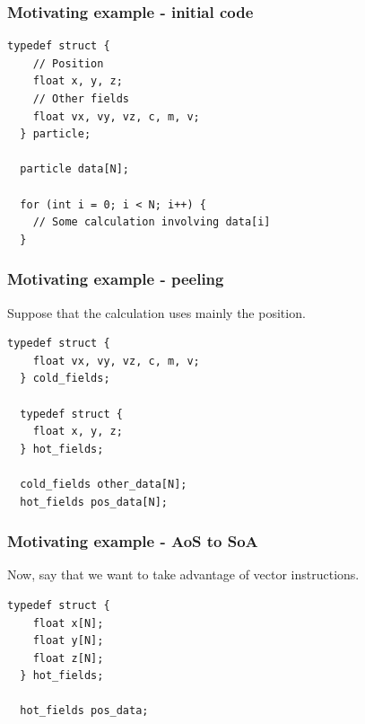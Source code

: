 \begin{frame}[fragile]
\frametitle{Motivating example - initial code}

\begin{lstlisting}[style=Cstyle]
  typedef struct {
    // Position
    float x, y, z;
    // Other fields
    float vx, vy, vz, c, m, v;
  } particle;

  particle data[N];

  for (int i = 0; i < N; i++) {
    // Some calculation involving data[i]
  }
\end{lstlisting}

\end{frame}


\begin{frame}[fragile]
\frametitle{Motivating example - peeling}

Suppose that the calculation uses mainly the position.

\begin{lstlisting}[style=Cstyle]
  typedef struct {
    float vx, vy, vz, c, m, v;
  } cold_fields;

  typedef struct {
    float x, y, z;
  } hot_fields;

  cold_fields other_data[N];
  hot_fields pos_data[N];
\end{lstlisting}

\end{frame}


\begin{frame}[fragile]
\frametitle{Motivating example - AoS to SoA}

Now, say that we want to take advantage of vector instructions.

\bigskip

\begin{lstlisting}[style=Cstyle]
  typedef struct {
    float x[N];
    float y[N];
    float z[N];
  } hot_fields;

  hot_fields pos_data;
\end{lstlisting}

\end{frame}


